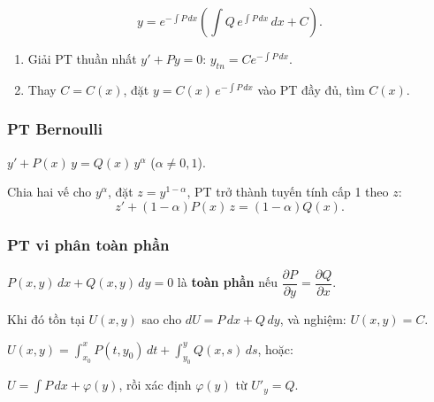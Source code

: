 \documentclass[12pt,a4paper]{article}
\begin{document}
\begin{congthuc}[title={Nghiệm tổng quát}]
  \[
    y = e^{-\int P\,dx}\left(\int Q\,e^{\int P\,dx}\,dx + C\right).
  \]
\end{congthuc}

\begin{phuongphap}[title={Phương pháp biến thiên hằng số (Lagrange)}]
  \begin{enumerate}
    \item Giải PT thuần nhất $y' + Py = 0$: $y_{tn} = Ce^{-\int P\,dx}$.
    \item Thay $C = C(x)$, đặt $y = C(x)\,e^{-\int P\,dx}$ vào PT đầy đủ, tìm $C(x)$.
  \end{enumerate}
\end{phuongphap}

\subsubsection{PT Bernoulli}

\begin{dinhnghia}
  $y' + P(x)\,y = Q(x)\,y^\alpha$ \quad ($\alpha \ne 0, 1$).
\end{dinhnghia}

\begin{phuongphap}
  Chia hai vế cho $y^\alpha$, đặt $z = y^{1-\alpha}$, PT trở thành tuyến tính cấp 1 theo $z$:
  \[
    z' + (1-\alpha)P(x)\,z = (1-\alpha)Q(x).
  \]
\end{phuongphap}

\subsubsection{PT vi phân toàn phần}

\begin{dinhnghia}
  $P(x,y)\,dx + Q(x,y)\,dy = 0$ là \textbf{toàn phần} nếu $\dfrac{\partial P}{\partial y} = \dfrac{\partial Q}{\partial x}$.

  Khi đó tồn tại $U(x,y)$ sao cho $dU = P\,dx + Q\,dy$, và nghiệm: $U(x,y) = C$.
\end{dinhnghia}

\begin{phuongphap}[title={Tìm $U$}]
  $U(x,y) = \displaystyle\int_{x_0}^{x} P(t, y_0)\,dt + \int_{y_0}^{y} Q(x, s)\,ds$, hoặc:

  $U = \displaystyle\int P\,dx + \varphi(y)$, rồi xác định $\varphi(y)$ từ $U'_y = Q$.
\end{phuongphap}
\end{document}
